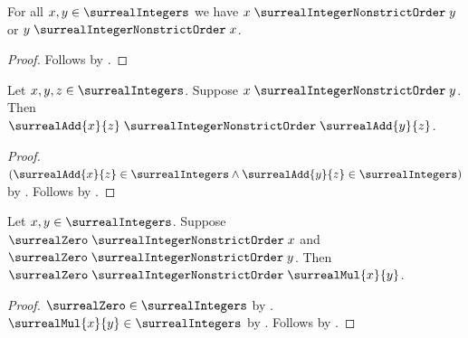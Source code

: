 \begin{proposition}\label{surreal_integer_nonstrict_order_total}
    For all $x,y\in\surrealIntegers$ we have
        $x\mathrel{\surrealIntegerNonstrictOrder}y$ or
        $y\mathrel{\surrealIntegerNonstrictOrder}x$.
\end{proposition}
\begin{proof}
    Follows by
        .
\end{proof}

\begin{proposition}\label{surreal_integer_nonstrict_order_addition}
    Let $x,y,z\in\surrealIntegers$.
    Suppose $x\mathrel{\surrealIntegerNonstrictOrder}y$.
    Then $\surrealAdd{x}{z}
            \mathrel{\surrealIntegerNonstrictOrder}
        \surrealAdd{y}{z}$.
\end{proposition}
\begin{proof}
    $(\surrealAdd{x}{z}\in\surrealIntegers\land
        \surrealAdd{y}{z}\in\surrealIntegers)$
        by .
    Follows by
        .
\end{proof}

\begin{proposition}\label{surreal_integer_nonstrict_order_multiplication}
    Let $x,y\in\surrealIntegers$.
    Suppose $\surrealZero\mathrel{\surrealIntegerNonstrictOrder}x$ and
        $\surrealZero\mathrel{\surrealIntegerNonstrictOrder}y$.
    Then $\surrealZero\mathrel{\surrealIntegerNonstrictOrder}
        \surrealMul{x}{y}$.
\end{proposition}
\begin{proof}
    $\surrealZero\in\surrealIntegers$
        by .
    $\surrealMul{x}{y}\in\surrealIntegers$
        by .
    Follows by
        .
\end{proof}

